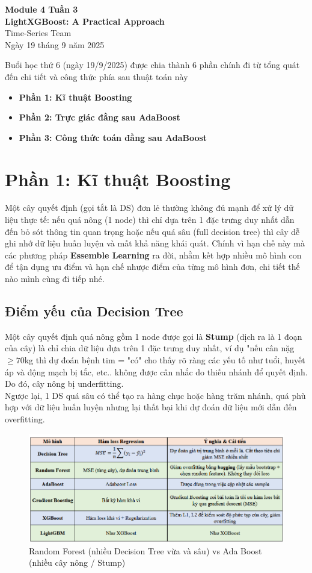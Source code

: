 \documentclass[11pt]{article}
\renewcommand{\maketitle}{%
    \begin{center}
        \fontsize{18}{20}\selectfont\textbf{Module 4 Tuần 3 \\[0.2em] LightXGBoost: A Practical Approach}\\[1em]
        \fontsize{14}{16}\selectfont Time-Series Team\\[0.5em]
        \fontsize{14}{16}\selectfont Ngày 19 tháng 9 năm 2025
    \end{center}
    \vspace{1.5em}
}
\begin{document}
\maketitle

\begin{summarybox}
Buổi học thứ 6 (ngày 19/9/2025) được chia thành 6 phần chính đi từ tổng quát đến chi tiết và công thức phía sau thuật toán này
    \begin{itemize}
        \item \textbf{Phần 1: Kĩ thuật Boosting}
        \item \textbf{Phần 2: Trực giác đằng sau AdaBoost }
        \item \textbf{Phần 3: Công thức toán đằng sau AdaBoost}
    \end{itemize}
\end{summarybox}

\section{Phần 1: Kĩ thuật Boosting}
Một cây quyết định (gọi tắt là DS) đơn lẻ thường không đủ mạnh để xử lý dữ liệu thực tế: nếu quá nông (1 node) thì chỉ dựa trên 1 đặc trưng duy nhất dẫn đến bỏ sót thông tin quan trọng hoặc nếu quá sâu (full decision tree) thì cây dễ ghi nhớ dữ liệu huấn luyện và mất khả năng khái quát. Chính vì hạn chế này mà các phương pháp \textbf{Essemble Learning} ra đời, nhằm kết hợp nhiều mô hình con để tận dụng ưu điểm và hạn chế nhược điểm của từng mô hình đơn, chi tiết thế nào mình cùng đi tiếp nhé.

 \subsection{Điểm yếu của Decision Tree}
Một cây quyết định quá nông gồm 1 node được gọi là \textbf{Stump} (dịch ra là 1 đoạn của cây) là chỉ chia dữ liệu dựa trên 1 đặc trưng duy nhất, ví dụ "nếu cân nặg $\geq 70$kg thì dự đoán bệnh tim = "có" cho thấy rõ ràng các yếu tố như tuổi, huyết áp và động mạch bị tắc, etc.. không được cân nhắc do thiếu nhánh để quyết định. Do đó, cây nông bị underfitting. \\

Ngược lại, 1 DS quá sâu có thể tạo ra hàng chục hoặc hàng trăm nhánh, quá phù hợp với dữ liệu huấn luyện nhưng lại thất bại khi dự đoán dữ liệu mới dẫn đến overfitting. 

\begin{figure}[H]
    \centering
    \includegraphics[width=0.7\linewidth]{images/loss_regr.png}
    \caption{Random Forest (nhiều Decision Tree vừa và sâu) vs Ada Boost (nhiều cây nông / Stump)}
\end{figure}
 
\end{document}
